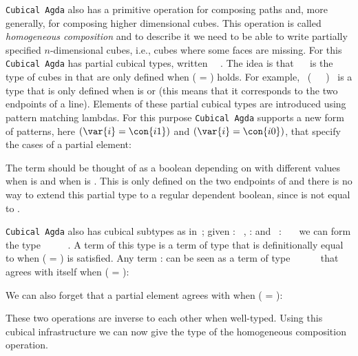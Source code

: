 \texttt{Cubical Agda} also has a primitive operation for composing
paths and, more generally, for composing higher dimensional
cubes. This operation is called \emph{homogeneous composition} and to
describe it we need to be able to write partially specified
$n$-dimensional cubes, i.e., cubes where some faces are missing. For
this \texttt{Cubical Agda} has partial cubical types, written
~~. The idea is that
~~ is the type of cubes in  that
are only defined when ( = ) holds. For example,
~(~~~)~ is a type
that is only defined when  is  or  (this means
that it corresponds to the two endpoints of a line). Elements of these
partial cubical types are introduced using pattern matching
lambdas. For this purpose \texttt{Cubical Agda} supports a new form of
patterns, here $(\var{i} = \con{i1})$ and $(\var{i} = \con{i0})$, that
specify the cases of a partial element:
%

The term  should be thought of as a boolean
depending on  with different values when  is 
and when  is .
This is only defined on the two endpoints of  and there is no
way to extend this partial type to a regular dependent boolean, since
 is not equal to .

\texttt{Cubical Agda} also has cubical subtypes as in~;
given  : ~,  :  and
~:~~~ we can form the type
~\func{[}~~~~\func{]}.  A term  of
this type is a term of type  that is definitionally equal to
 when ( = ) is satisfied. Any term  :
 can be seen as a term of type
~\func{[}~~~~\func{]} that agrees with
itself when ( = ):
%

We can also forget that a partial element agrees with  when
( = ):
%

These two operations are inverse to each other when well-typed. Using
this cubical infrastructure we can now give the type of the
homogeneous composition operation.
%

